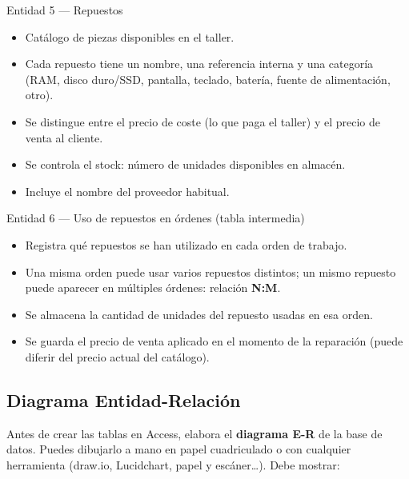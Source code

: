 \documentclass[12pt,a4paper]{article}
\begin{document}
\vspace{0.25cm}

\begin{tablabox}{Entidad 5 — Repuestos}
\begin{itemize}
  \item Catálogo de piezas disponibles en el taller.
  \item Cada repuesto tiene un nombre, una referencia interna y una categoría
        (RAM, disco duro/SSD, pantalla, teclado, batería, fuente de alimentación, otro).
  \item Se distingue entre el precio de coste (lo que paga el taller) y el precio de venta al cliente.
  \item Se controla el stock: número de unidades disponibles en almacén.
  \item Incluye el nombre del proveedor habitual.
\end{itemize}
\end{tablabox}

\vspace{0.25cm}

\begin{tablabox}{Entidad 6 — Uso de repuestos en órdenes (tabla intermedia)}
\begin{itemize}
  \item Registra qué repuestos se han utilizado en cada orden de trabajo.
  \item Una misma orden puede usar varios repuestos distintos; un mismo repuesto puede
        aparecer en múltiples órdenes: relación \textbf{N:M}.
  \item Se almacena la cantidad de unidades del repuesto usadas en esa orden.
  \item Se guarda el precio de venta aplicado en el momento de la reparación (puede diferir
        del precio actual del catálogo).
\end{itemize}
\end{tablabox}

\vspace{0.4cm}

\subsection{Diagrama Entidad-Relación}

Antes de crear las tablas en Access, elabora el \textbf{diagrama E-R} de la base de datos.
Puedes dibujarlo a mano en papel cuadriculado o con cualquier herramienta (draw.io, Lucidchart,
papel y escáner\ldots). Debe mostrar:
\end{document}
